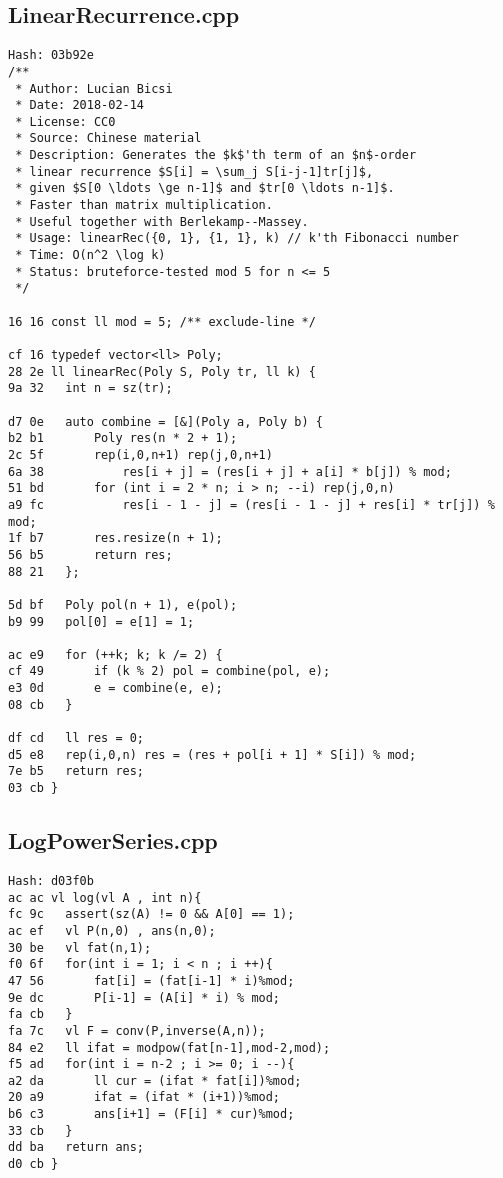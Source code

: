 \documentclass[11pt, a4paper, twoside]{article}
\begin{document}
\subsection{LinearRecurrence.cpp}
\begin{lstlisting}
Hash: 03b92e
/**
 * Author: Lucian Bicsi
 * Date: 2018-02-14
 * License: CC0
 * Source: Chinese material
 * Description: Generates the $k$'th term of an $n$-order
 * linear recurrence $S[i] = \sum_j S[i-j-1]tr[j]$,
 * given $S[0 \ldots \ge n-1]$ and $tr[0 \ldots n-1]$.
 * Faster than matrix multiplication.
 * Useful together with Berlekamp--Massey.
 * Usage: linearRec({0, 1}, {1, 1}, k) // k'th Fibonacci number
 * Time: O(n^2 \log k)
 * Status: bruteforce-tested mod 5 for n <= 5
 */

16 16 const ll mod = 5; /** exclude-line */

cf 16 typedef vector<ll> Poly;
28 2e ll linearRec(Poly S, Poly tr, ll k) {
9a 32 	int n = sz(tr);
      
d7 0e 	auto combine = [&](Poly a, Poly b) {
b2 b1 		Poly res(n * 2 + 1);
2c 5f 		rep(i,0,n+1) rep(j,0,n+1)
6a 38 			res[i + j] = (res[i + j] + a[i] * b[j]) % mod;
51 bd 		for (int i = 2 * n; i > n; --i) rep(j,0,n)
a9 fc 			res[i - 1 - j] = (res[i - 1 - j] + res[i] * tr[j]) % mod;
1f b7 		res.resize(n + 1);
56 b5 		return res;
88 21 	};
      
5d bf 	Poly pol(n + 1), e(pol);
b9 99 	pol[0] = e[1] = 1;
      
ac e9 	for (++k; k; k /= 2) {
cf 49 		if (k % 2) pol = combine(pol, e);
e3 0d 		e = combine(e, e);
08 cb 	}
      
df cd 	ll res = 0;
d5 e8 	rep(i,0,n) res = (res + pol[i + 1] * S[i]) % mod;
7e b5 	return res;
03 cb }
\end{lstlisting}

\subsection{LogPowerSeries.cpp}
\begin{lstlisting}
Hash: d03f0b
ac ac vl log(vl A , int n){
fc 9c 	assert(sz(A) != 0 && A[0] == 1);
ac ef 	vl P(n,0) , ans(n,0);
30 be 	vl fat(n,1);
f0 6f 	for(int i = 1; i < n ; i ++){
47 56 		fat[i] = (fat[i-1] * i)%mod;
9e dc 		P[i-1] = (A[i] * i) % mod;
fa cb 	}
fa 7c 	vl F = conv(P,inverse(A,n));
84 e2 	ll ifat = modpow(fat[n-1],mod-2,mod);
f5 ad 	for(int i = n-2 ; i >= 0; i --){
a2 da 		ll cur = (ifat * fat[i])%mod;
20 a9 		ifat = (ifat * (i+1))%mod;
b6 c3 		ans[i+1] = (F[i] * cur)%mod;
33 cb 	}
dd ba 	return ans;
d0 cb }
\end{lstlisting}
\end{document}
